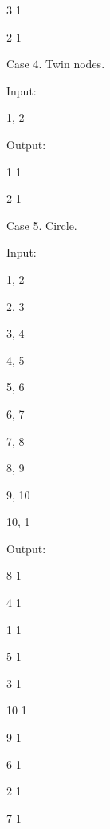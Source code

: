 \begin{itemize*}
3	1

2	1

\item{Case 4. Twin nodes.}

Input:

1, 2

Output:

1	1

2	1

\item{Case 5. Circle.}

Input:

1, 2

2, 3

3, 4

4, 5

5, 6

6, 7

7, 8

8, 9

9, 10

10, 1

Output:

8	1

4	1

1	1

5	1

3	1

10	1

9	1

6	1

2	1

7	1
\end{itemize*}

